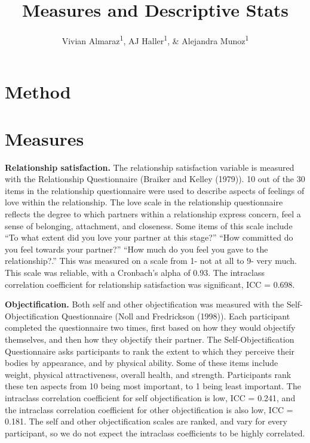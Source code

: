 \documentclass[
  english,
  man]{apa6}
\title{Measures and Descriptive Stats}
\author{Vivian Almaraz\textsuperscript{1}, AJ Haller\textsuperscript{1}, \& Alejandra Munoz\textsuperscript{1}}
\date{}
\affiliation{\vspace{0.5cm}\textsuperscript{1} Smith College}
\begin{document}
\maketitle

\hypertarget{method}{%
\section{Method}\label{method}}

\hypertarget{measures}{%
\section{Measures}\label{measures}}

\textbf{Relationship satisfaction.} The relationship satisfaction variable is measured with the Relationship Questionnaire (Braiker and Kelley (1979)). 10 out of the 30 items in the relationship questionnaire were used to describe aspects of feelings of love within the relationship. The love scale in the relationship questionnaire reflects the degree to which partners within a relationship express concern, feel a sense of belonging, attachment, and closeness. Some items of this scale include ``To what extent did you love your partner at this stage?'' ``How committed do you feel towards your partner?'' ``How much do you feel you gave to the relationship?.'' This was measured on a scale from 1- not at all to 9- very much. This scale was reliable, with a Cronbach's alpha of 0.93. The intraclass correlation coefficient for relationship satisfaction was significant, ICC = 0.698.

\textbf{Objectification.} Both self and other objectification was measured with the Self-Objectification Questionnaire (Noll and Fredrickson (1998)). Each participant completed the questionnaire two times, first based on how they would objectify themselves, and then how they objectify their partner. The Self-Objectification Questionnaire asks participants to rank the extent to which they perceive their bodies by appearance, and by physical ability. Some of these items include weight, physical attractiveness, overall health, and strength. Participants rank these ten aspects from 10 being most important, to 1 being least important. The intraclass correlation coefficient for self objectification is low, ICC = 0.241, and the intraclass correlation coefficient for other objectification is also low, ICC = 0.181. The self and other objectification scales are ranked, and vary for every participant, so we do not expect the intraclass coefficients to be highly correlated.
\end{document}
